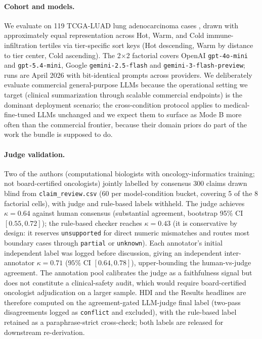 \documentclass{article}
\theoremstyle{plain}
\begin{document}
\paragraph{Cohort and models.} We evaluate on 119 TCGA-LUAD lung adenocarcinoma cases \citep{collisson2014comprehensive}, drawn with approximately equal representation across Hot, Warm, and Cold immune-infiltration tertiles via tier-specific sort keys (Hot descending, Warm by distance to tier center, Cold ascending). The 2$\times$2 factorial covers OpenAI \texttt{gpt-4o-mini} and \texttt{gpt-5.4-mini}, Google \texttt{gemini-2.5-flash} and \texttt{gemini-3-flash-preview}; runs are April 2026 with bit-identical prompts across providers. We deliberately evaluate commercial general-purpose LLMs because the operational setting we target (clinical summarization through scalable commercial endpoints) is the dominant deployment scenario; the cross-condition protocol applies to medical-fine-tuned LLMs unchanged and we expect them to surface as Mode B more often than the commercial frontier, because their domain priors do part of the work the bundle is supposed to do.

\paragraph{Judge validation.} Two of the authors (computational biologists with oncology-informatics training; not board-certified oncologists) jointly labelled by consensus 300 claims drawn blind from \texttt{claim\_review.csv} (60 per model-condition bucket, covering 5 of the 8 factorial cells), with judge and rule-based labels withheld. The judge achieves $\kappa = 0.64$ against human consensus (substantial agreement, bootstrap 95\% CI $[0.55, 0.72]$); the rule-based checker reaches $\kappa = 0.43$ (it is conservative by design: it reserves \texttt{unsupported} for direct numeric mismatches and routes most boundary cases through \texttt{partial} or \texttt{unknown}). Each annotator's initial independent label was logged before discussion, giving an independent inter-annotator $\kappa = 0.71$ ($95\%$ CI $[0.64, 0.78]$), upper-bounding the human-vs-judge agreement. The annotation pool calibrates the judge as a faithfulness signal but does not constitute a clinical-safety audit, which would require board-certified oncologist adjudication on a larger sample. HDI and the Results headlines are therefore computed on the agreement-gated LLM-judge final label (two-pass disagreements logged as \texttt{conflict} and excluded), with the rule-based label retained as a paraphrase-strict cross-check; both labels are released for downstream re-derivation.
\end{document}
